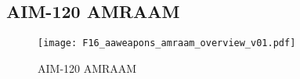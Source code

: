 \marginfigrestore 

\subsection{AIM-120 AMRAAM}
\label{subsec:aim120}
\begin{figure}[htbp]
    \centering
    \texttt{[image: F16\_aaweapons\_amraam\_overview\_v01.pdf]}
    \caption{AIM-120 AMRAAM}
\end{figure}

